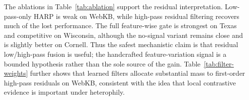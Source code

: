 \documentclass[letterpaper]{article} %
\newcommand{\base}{HARP-GNN}
\newcommand{\papertablesize}{\footnotesize}
\begin{document}
\begin{table}[t]
\centering
\caption{WebKB ablations isolating multi-hop mixing, low/high-pass residual branches, and the gate signal.}
\label{tab:ablation}
\begingroup
\setlength{\tabcolsep}{2.2pt}
\renewcommand{\arraystretch}{1.08}
\papertablesize
{}
\endgroup
\end{table}

\begin{table}[t]
\centering
\caption{Learned \base{} polynomial weights on WebKB. Low-pass bases are $L_0,\ldots,L_3$ and high-pass residual bases are $H_1,\ldots,H_3$.}
\label{tab:filter-weights}
\begingroup
\setlength{\tabcolsep}{2.2pt}
\renewcommand{\arraystretch}{1.08}
\papertablesize
{}
\endgroup
\end{table}

The ablations in Table~\ref{tab:ablation} support the residual interpretation.
Low-pass-only HARP is weak on WebKB, while high-pass residual filtering recovers much of the lost performance.
The full feature-wise gate is strongest on Texas and competitive on Wisconsin, although the no-signal variant remains close and is slightly better on Cornell.
Thus the safest mechanistic claim is that residual low/high-pass fusion is useful; the handcrafted feature-variation signal is a bounded hypothesis rather than the sole source of the gain.
Table~\ref{tab:filter-weights} further shows that learned filters allocate substantial mass to first-order high-pass residuals on WebKB, consistent with the idea that local contrastive evidence is important under heterophily.
\end{document}
